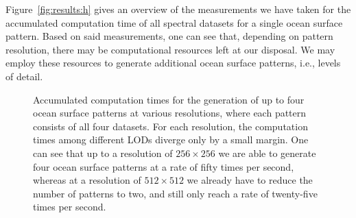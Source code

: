 %
%
Figure~\ref{fig:results:h} gives an overview of the measurements we have taken
for the accumulated computation time of all spectral datasets for a single
ocean surface pattern. Based on said measurements, one can see that, depending
on pattern resolution, there may be computational resources left at our
disposal.
We may employ these resources to generate additional ocean surface patterns,
i.e., levels of detail.
%
\begin{figure}
\centering
\mydata
{}
\caption[Accumulated computation times for the generation of up to four
ocean surface patterns at various resolutions, where each pattern consists of
all four datasets.]{
Accumulated computation times for the generation of up to four
ocean surface patterns at various resolutions, where each pattern consists of
all four datasets.
For each resolution, the computation times among different LODs diverge only
by a small margin.
One can see that up to a resolution of $256 \times 256$ we are able to generate
four ocean surface patterns at a rate of fifty times per second, whereas at a
resolution of $512 \times 512$ we already have to reduce the number of patterns
to two, and still only reach a rate of twenty-five times per second.}
\label{fig:results:lods}
\end{figure}
